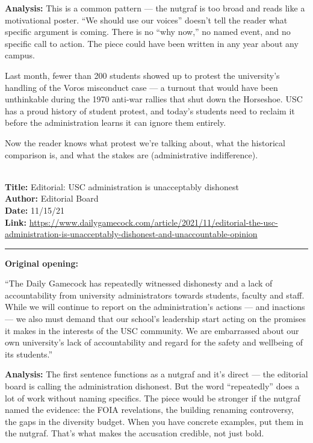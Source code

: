 \documentclass[12pt]{article}
\newcounter{examplenum}
\newcommand{\totalexamples}{10}
\newcommand{\exampleheader}[4]{%
    \newpage
    \stepcounter{examplenum}%
    \noindent{\large\bfseries\color{garnet} Example \theexamplenum\ of \totalexamples}\\[6pt]
    \textbf{Title:} #1\\
    \textbf{Author:} #2\\
    \textbf{Date:} #3\\
    \textbf{Link:} \url{#4}\\[4pt]
    \noindent\rule{\textwidth}{0.4pt}
    \vspace{6pt}
}
\begin{document}
\textbf{Analysis:} This is a common pattern --- the nutgraf is too broad and reads like a motivational poster. ``We should use our voices'' doesn't tell the reader what specific argument is coming. There is no ``why now,'' no named event, and no specific call to action. The piece could have been written in any year about any campus.

\begin{seasonbox}
Last month, fewer than 200 students showed up to protest the university's handling of the Voros misconduct case --- a turnout that would have been unthinkable during the 1970 anti-war rallies that shut down the Horseshoe. USC has a proud history of student protest, and today's students need to reclaim it before the administration learns it can ignore them entirely.
\end{seasonbox}

Now the reader knows what protest we're talking about, what the historical comparison is, and what the stakes are (administrative indifference).

\exampleheader{Editorial: USC administration is unacceptably dishonest}{Editorial Board}{11/15/21}{https://www.dailygamecock.com/article/2021/11/editorial-the-usc-administration-is-unacceptably-dishonest-and-unaccountable-opinion}

\begin{promptbox}
\textbf{Original opening:}

``The Daily Gamecock has repeatedly witnessed dishonesty and a lack of accountability from university administrators towards students, faculty and staff. While we will continue to report on the administration's actions --- and inactions --- we also must demand that our school's leadership start acting on the promises it makes in the interests of the USC community. We are embarrassed about our own university's lack of accountability and regard for the safety and wellbeing of its students.''
\end{promptbox}

\textbf{Analysis:} The first sentence functions as a nutgraf and it's direct --- the editorial board is calling the administration dishonest. But the word ``repeatedly'' does a lot of work without naming specifics. The piece would be stronger if the nutgraf named the evidence: the FOIA revelations, the building renaming controversy, the gaps in the diversity budget. When you have concrete examples, put them in the nutgraf. That's what makes the accusation credible, not just bold.
\end{document}
